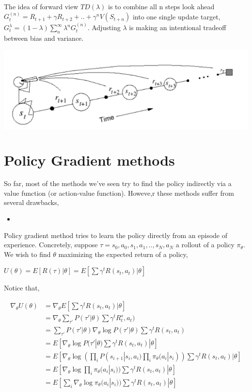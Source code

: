 \documentclass[graybox]{svmult}
\begin{document}
The idea of forward view $TD(\lambda)$ is to combine all n steps look ahead $G^{(n)}_t = R_{t+1} + \gamma R_{t+2} + .. + \gamma^nV(S_{t+n})$ into one single update target, $G^{\lambda}_t = (1-\lambda)\sum^{\infty}_{n}\lambda^n G^{(n)}_t$. Adjusting $\lambda$ is making an intentional tradeoff between bias and variance.

\includegraphics[width=\textwidth]{forward.png}

\section{Policy Gradient methods}

So far, most of the methods we've seen try to find the policy indirectly via a value function (or action-value function). Howeve,r these methods suffer from several drawbacks, 

\begin{itemize}
\item 
\end{itemize}

Policy gradient method tries to learn the policy directly from an episode of experience. Concretely, suppose $\tau = s_0, a_0, s_1, a_1, .. , s_N, a_N$ a rollout of a policy $\pi_{\theta}$. We wish to find $\theta$ maximizing the expected return of a policy,

\begin{center}
 $U(\theta) = E[R(\tau) | \theta] = E[\sum \gamma^t R(s_t, a_t) | \theta]$
\end{center}

Notice that,

\begin{equation}
\begin{split}
\nabla_{\theta} U(\theta) & = \nabla_{\theta} E[\sum \gamma^t R(s_t, a_t) | \theta]  \\
 & = \nabla_{\theta} \sum_{\tau'} P(\tau' | \theta) \sum \gamma^t R^s_t, a_t) \\ & = \sum_{\tau'} P(\tau' | \theta) \nabla_{\theta} \log P(\tau' | \theta) \sum \gamma^t R(s_t, a_t) \\ & = E[ \nabla_{\theta} \log P(\tau' | \theta) \sum \gamma^t R(s_t, a_t) | \theta]  \\ & = E[ \nabla_{\theta} \log (\prod_i P(s_{i+1} | s_i, a_i) \prod_i \pi_{\theta} (a_i | s_i)) \sum \gamma^t R(s_t, a_t) | \theta] \\ & = E[ \nabla_{\theta} \log \prod_i \pi_{\theta} (a_i | s_i)) \sum \gamma^t R(s_t, a_t) | \theta] \\ & = E[ \sum_i \nabla_{\theta}  \log \pi_{\theta} (a_i | s_i)) \sum \gamma^t R(s_t, a_t) | \theta]
\end{split}
\end{equation}
\end{document}
